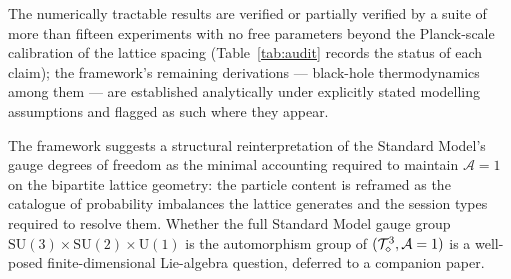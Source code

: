 The numerically tractable results are verified or partially verified
by a suite of more than fifteen experiments with no free parameters
beyond the Planck-scale calibration of the lattice spacing
(Table~\ref{tab:audit} records the status of each claim);
the framework's remaining derivations --- black-hole thermodynamics
among them --- are established analytically under explicitly stated
modelling assumptions and flagged as such where they appear.

The framework suggests a structural reinterpretation of the
Standard Model's gauge degrees of freedom as the minimal accounting
required to maintain $\mathcal{A}=1$ on the bipartite lattice
geometry: the particle content is reframed as the catalogue of
probability imbalances the lattice generates and the session types
required to resolve them.  Whether the full Standard Model gauge
group $\mathrm{SU}(3)\!\times\!\mathrm{SU}(2)\!\times\!\mathrm{U}(1)$
is the automorphism group of $(\mathcal{T}_\diamond^3, \mathcal{A}=1)$ is a
well-posed finite-dimensional Lie-algebra question, deferred to a
companion paper.
